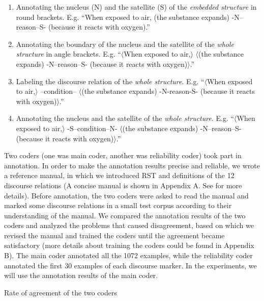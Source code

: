 \documentclass[english]{jnlp_1.3e}
\begin{document}
\begin{enumerate}
  \item Annotating the nucleus (N) and the satellite (S) of the \textit{embedded structure}
in round \linebreak
brackets. E.g. ``When exposed to air, (the substance expands) -N--reason--S- (because it reacts with oxygen).''
  \item Annotating the boundary of the nucleus and the satellite of the
\textit{whole structure} in angle brackets. E.g. ``$\langle$When exposed to air,$\rangle$ $\langle$(the substance expands) -N--reason--S- (because it reacts with oxygen)$\rangle$.''
  \item Labeling the discourse relation of the \textit{whole structure}.
E.g. ``$\langle$When exposed to air,$\rangle$ --condition-- $\langle$(the substance expands) -N-reason-S- (because it reacts with oxygen)$\rangle$.''
  \item Annotating the nucleus and the satellite of the \textit{whole structure}. E.g. ``$\langle$When exposed to air,$\rangle$ -S--condition--N- $\langle$(the substance expands) -N--reason--S- (because it reacts with oxygen)$\rangle$.''
\end{enumerate}

Two coders (one was main coder, another was reliability coder) 
took part in annotation. In order to make the annotation results 
precise and reliable, we wrote a reference manual, in which we 
introduced RST and definitions of the 12 discourse relations 
(A concise manual is shown in Appendix A. See \cite{Deng06} for more details). 
Before annotation, the two coders were asked to read the manual 
and marked some discourse relations in a small test corpus 
according to their understanding of the manual. We compared 
the annotation results of the two coders and analyzed the problems 
that caused disagreement, based on which we revised the manual and 
trained the coders until the agreement became satisfactory 
(more details about training the coders could be found in Appendix B). 
The main coder annotated all the 1072 examples, while the reliability 
coder annotated the first 30 examples of each discourse marker. 
In the experiments, we will use the annotation results of the main coder. 

\begin{table}[b]
\caption{Rate of agreement of the two coders}

\vspace{-1\baselineskip}
\end{table}
\end{document}
